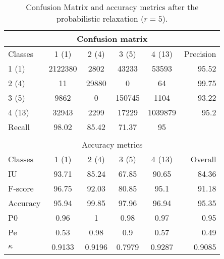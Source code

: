 \begin{table}[H]
\begin{center}
\footnotesize
\begin{tabular}{|l|c|c|c|c|r|}
\hline
\multicolumn{6}{|c|}{Confusion matrix} \\
\hline
 Classes & 1 (1) & 2 (4) & 3 (5) & 4 (13) & Precision \\
\hline
1 (1) & 2122380 & 2802 & 43233 & 53593 & 95.52 \\
\hline
2 (4) & 11 & 29880 & 0 & 64 & 99.75 \\
\hline
3 (5) & 9862 & 0 & 150745 & 1104 & 93.22 \\
\hline
4 (13) & 32943 & 2299 & 17229 & 1039879 & 95.2 \\
\hline
Recall & 98.02 & 85.42 & 71.37 & 95 &  \\
\hline
\multicolumn{6}{c}{ } \\
\hline
\multicolumn{6}{|c|}{Accuracy metrics} \\
\hline
 Classes & 1 (1) & 2 (4) & 3 (5) & 4 (13) & Overall \\
\hline
IU & 93.71 & 85.24 & 67.85 & 90.65 & 84.36 \\
\hline
F-score & 96.75 & 92.03 & 80.85 & 95.1 & 91.18 \\
\hline
Accuracy & 95.94 & 99.85 & 97.96 & 96.94 & 95.35 \\
\hline
P0 & 0.96 & 1 & 0.98 & 0.97 & 0.95 \\
\hline
Pe & 0.53 & 0.98 & 0.9 & 0.57 & 0.49 \\
\hline
$\kappa$ & 0.9133 & 0.9196 & 0.7979 & 0.9287 & 0.9085 \\
\hline
\end{tabular}
\caption{Confusion Matrix and accuracy metrics after the probabilistic relaxation ($r=5$).}
\label{table:}
\end{center}
\end{table}
